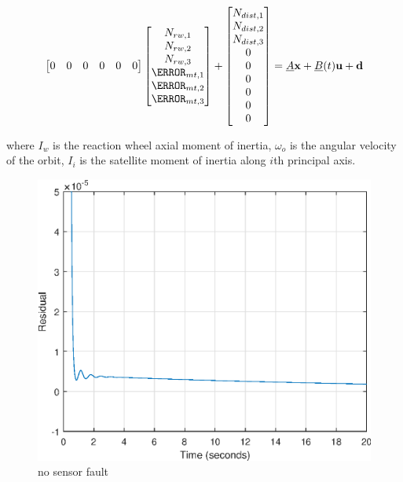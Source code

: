 \begin{align}
\begin{bmatrix}
0 & 0 & 0 & 0 & 0 & 0 \\
\end{bmatrix}
\begin{bmatrix}
N_{rw,1} \\
N_{rw,2} \\
N_{rw,3}\\
\m_{mt,1} \\
\m_{mt,2} \\
\m_{mt,3} 
\end{bmatrix}
+
\begin{bmatrix}
N_{dist,1} \\
N_{dist,2} \\
N_{dist,3}\\
0\\
0\\
0\\
0\\
0\\
0
\end{bmatrix}
=
\underline{A}\vec{x} + \underline{B}(t)\vec{u} + \vec{d}
\label{eq:uioMatrices}
\end{align}

where $I_w$ is the reaction wheel axial moment of inertia, $\omega_o$ is the angular velocity of the orbit, $I_i$ is the satellite moment of inertia along $i$th principal axis.



\begin{figure}[H]
	\centering
	\includegraphics[width=0.7\linewidth]{figures/nosensfault_res}
	\caption{no sensor fault }
	\label{fig:}
\end{figure}

